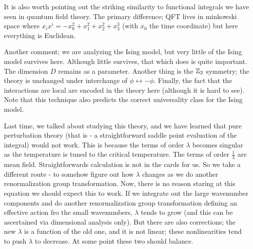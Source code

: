 It is also worth pointing out the striking similarity to functional integrals we have seen in quantum field theory. The primary difference; QFT lives in minkowski space where $x_ix^i = -x_0^2 + x_1^2 + x_2^2 + x_3^3$ (with $x_0$ the time coordinate) but here everything is Euclidean.

Another comment; we are analyzing the Ising model, but very little of the Ising model survives here. Although little survives, that which does is quite important. The dimension $D$ remains as a parameter. Another thing is the $\mathbb{Z}_2$ symmetry; the theory is unchanged under interchange of $\phi \leftrightarrow -\phi$. Finally, the fact that the interactions are local are encoded in the theory here (although it is hard to see). Note that this technique also predicts the correct universality class for the Ising model.

Last time, we talked about studying this theory, and we have learned that pure perturbation theory (that is - a straightforward saddle point evaluation of the integral) would not work. This is because the terms of order $\lambda$ becomes singular as the temperature is tuned to the critical temperature. The terms of order $\frac{1}{\lambda}$ are mean field. Straightforwards calculation is not in the cards for us. So we take a different route - to somehow figure out how $\lambda$ changes as we do another renormalization group transformation. Now, there is no reason staring at this equation we should expect this to work. If we integrate out the large wavenumber components and do another renormalization group transformation defining an effective action fro the small wavenumbers, $\lambda$ tends to grow (and this can be ascertained via dimensional analysis only). But there are also corrections; the new $\lambda$ is a function of the old one, and it is not linear; these nonlinearities tend to push $\lambda$ to decrease. At some point these two should balance.

